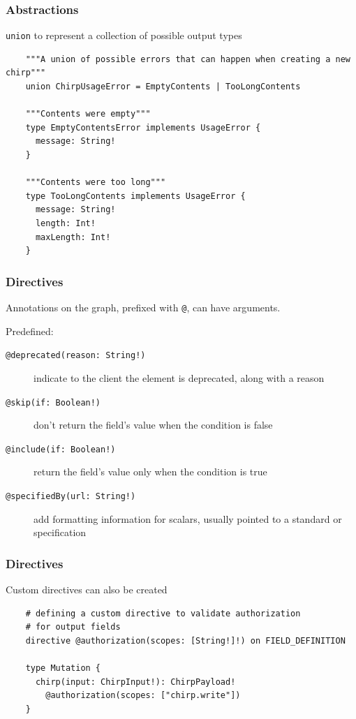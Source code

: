 \documentclass{beamer}
\begin{document}
\begin{frame}[fragile]
  \frametitle{Abstractions}
  \texttt{union} to represent a collection of possible output types
  \begin{verbatim}
    """A union of possible errors that can happen when creating a new chirp"""
    union ChirpUsageError = EmptyContents | TooLongContents

    """Contents were empty"""
    type EmptyContentsError implements UsageError {
      message: String!
    }

    """Contents were too long"""
    type TooLongContents implements UsageError {
      message: String!
      length: Int!
      maxLength: Int!
    }
  \end{verbatim}
\end{frame}


\begin{frame}[fragile]
  \frametitle{Directives}
  Annotations on the graph, prefixed with \texttt{@}, can have arguments.

  Predefined:
  \begin{description}
  \item [\texttt{@deprecated(reason: String!)}]
    indicate to the client the element is deprecated, along with a reason
  \item [\texttt{@skip(if: Boolean!)}]
    don't return the field's value when the condition is false
  \item [\texttt{@include(if: Boolean!)}]
    return the field's value only when the condition is true
  \item [\texttt{@specifiedBy(url: String!)}]
    add formatting information for scalars, usually pointed to a standard or specification
  \end{description}
\end{frame}


\begin{frame}[fragile]
  \frametitle{Directives}
  Custom directives can also be created
  \begin{verbatim}
    # defining a custom directive to validate authorization
    # for output fields
    directive @authorization(scopes: [String!]!) on FIELD_DEFINITION

    type Mutation {
      chirp(input: ChirpInput!): ChirpPayload!
        @authorization(scopes: ["chirp.write"])
    }
  \end{verbatim}
\end{frame}
\end{document}
